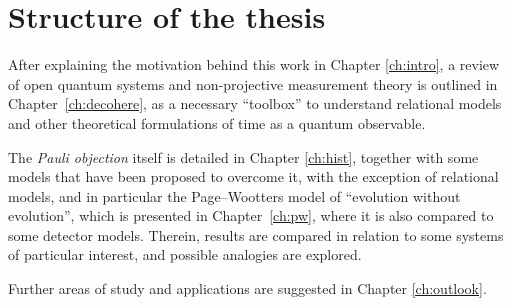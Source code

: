 \section{Structure of the thesis}\label{sec:struct}

After explaining the motivation behind this work in Chapter \ref{ch:intro},
a review of open quantum systems and non-projective measurement theory
is outlined in Chapter~\ref{ch:decohere}, as a necessary ``toolbox''
to understand relational models and other theoretical formulations
of time as a quantum observable.

The \emph{Pauli objection} itself is detailed in Chapter \ref{ch:hist},
together with some models that have been proposed to overcome it,
with the exception of relational models, and in particular the Page--Wootters model
of ``evolution without evolution'',
which is presented in Chapter~\ref{ch:pw},
where it is also compared to some detector models.
Therein, results are compared in relation to some systems of particular interest,
and possible analogies are explored.

Further areas of study and applications are suggested in Chapter \ref{ch:outlook}.